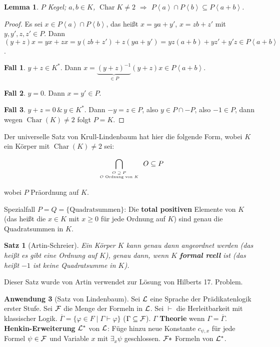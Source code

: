 \documentclass[headsepline=true,DIV=11]{scrartcl}
\newtheorem*{theorem}{Satz}
\newtheorem*{lemma}{Lemma}
\theoremstyle{definition}
\renewcommand{\bar}[1]{\overline{#1}}
\newcommand{\Char}{\operatorname{Char}}
\begin{document}
\begin{lemma}
  $P$ Kegel; $a,b\in K$, $\Char K\neq 2$ $\Rightarrow$ $P\left<a\right>\cap P\left<b\right>\subseteq P\left<a+b\right>$.
\end{lemma}

\begin{proof}
  Es sei $x\in P\left<a\right>\cap P\left<b\right>$, das heißt $x=ya+y'$, $x=zb+z'$ mit $y,y',z,z'\in P$. Dann
  $(y+z)x=yx+zx=y(zb+z')+z(ya+y')=yz(a+b)+yz'+y'z\in P\left<a+b\right>$.

  {\bf Fall 1}. $y+z\in K^*$. Dann $x=\underbrace{(y+z)^{-1}}_{\in P}(y+z)x\in P\left<a+b\right>$.

  {\bf Fall 2}. $y=0$. Dann $x=y'\in P$.

  {\bf Fall 3}. $y+z=0\,\&\,y\in K^*$. Dann $-y=z\in P$, also $y\in P\cap -P$, also $-1\in P$, dann wegen $\Char(K)\neq 2$ folgt $P=K$.
\end{proof}

Der universelle Satz von Krull-Lindenbaum hat hier die folgende Form, wobei $K$ ein Körper mit $\Char(K)\neq 2$ sei:

$$ \bigcap\limits_{\tiny \begin{array}{c}{O\supseteq P} \\ {O\mbox{ Ordnung von } K}\end{array}} O \subseteq P $$

wobei $P$ Präordnung auf $K$.

Spezialfall $P=Q=\{\mbox{Quadratsummen}\}$: Die {\bf total positiven} Elemente von $K$ (das heißt die $x\in K$ mit $x\ge 0$ für jede Ordnung auf $K$)
sind genau die Quadratsummen in $K$.

\begin{theorem}[Artin-Schreier]
  Ein Körper $K$ kann genau dann angeordnet werden (das heißt es gibt eine Ordnung auf $K$), genau dann, wenn $K$ {\bf formal reell} ist (das heißt
  $-1$ ist keine Quadratsumme in $K$).
\end{theorem}

Dieser Satz wurde von Artin verwendet zur Lösung von Hilberts 17. Problem.

{\bf Anwendung 3} (Satz von Lindenbaum). Sei $\cal L$ eine Sprache der Prädikatenlogik erster Stufe. Sei $\cal F$ die Menge der Formeln in $\cal
L$. Sei $\vdash$ die Herleitbarkeit mit klassischer Logik. $\bar{\Gamma} = \{\varphi\in F\mid \Gamma\vdash\varphi\}$ ($\Gamma\subseteq {\cal
  F}$). $\Gamma$ {\bf Theorie} wenn $\Gamma=\bar{\Gamma}$. {\bf Henkin-Erweiterung} ${\cal L}^*$ von $\cal L$: Füge hinzu neue Konstante $c_{\psi,x}$
für jede Formel $\psi\in {\cal F}$ und Variable $x$ mit $\exists_x\psi$ geschlossen. ${\cal F}*$ Formeln von ${\cal L}^*$.
\end{document}
